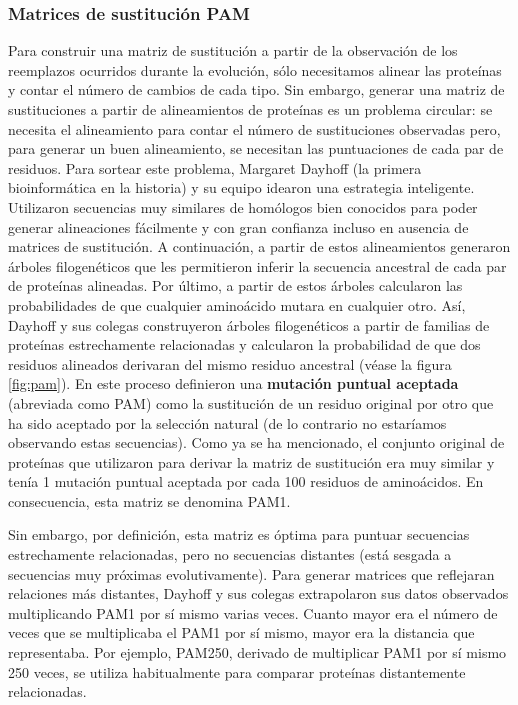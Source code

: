 \subsubsection{Matrices de sustitución PAM}
Para construir una matriz de sustitución a partir de la observación de los reemplazos ocurridos durante la evolución, sólo necesitamos alinear las proteínas y contar el número de cambios de cada tipo. Sin embargo, generar una matriz de sustituciones a partir de alineamientos de proteínas es un problema circular: se necesita el alineamiento para contar el número de sustituciones observadas pero, para generar un buen alineamiento, se necesitan las puntuaciones de cada par de residuos. Para sortear este problema, Margaret Dayhoff (la primera bioinformática en la historia) y su equipo idearon una estrategia inteligente. Utilizaron secuencias muy similares de homólogos bien conocidos para poder generar alineaciones fácilmente y con gran confianza incluso en ausencia de matrices de sustitución. A continuación, a partir de estos alineamientos generaron árboles filogenéticos que les permitieron inferir la secuencia ancestral de cada par de proteínas alineadas. Por último, a partir de estos árboles calcularon las probabilidades de que cualquier aminoácido mutara en cualquier otro. Así, Dayhoff y sus colegas construyeron árboles filogenéticos a partir de familias de proteínas estrechamente relacionadas y calcularon la probabilidad de que dos residuos alineados derivaran del mismo residuo ancestral (véase la figura \ref{fig:pam}). En este proceso definieron una \textbf{mutación puntual aceptada} (abreviada como PAM) como la sustitución de un residuo original por otro que ha sido aceptado por la selección natural (de lo contrario no estaríamos observando estas secuencias). Como ya se ha mencionado, el conjunto original de proteínas que utilizaron para derivar la matriz de sustitución era muy similar y tenía 1 mutación puntual aceptada por cada 100 residuos de aminoácidos. En consecuencia, esta matriz se denomina PAM1.

Sin embargo, por definición, esta matriz es óptima para puntuar secuencias estrechamente relacionadas, pero no secuencias distantes (está sesgada a secuencias muy próximas evolutivamente). Para generar matrices que reflejaran relaciones más distantes, Dayhoff y sus colegas extrapolaron sus datos observados multiplicando PAM1 por sí mismo varias veces. Cuanto mayor era el número de veces que se multiplicaba el PAM1 por sí mismo, mayor era la distancia que representaba. Por ejemplo, PAM250, derivado de multiplicar PAM1 por sí mismo 250 veces, se utiliza habitualmente para comparar proteínas distantemente relacionadas.

